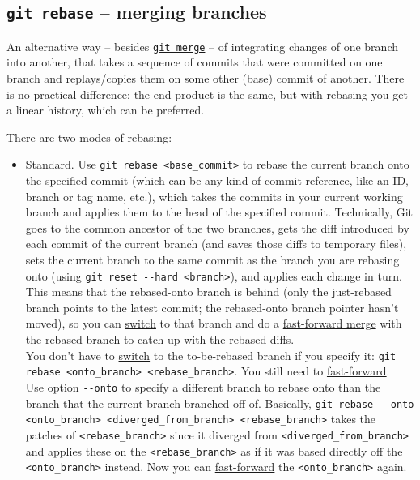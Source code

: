 \documentclass[8pt, table, xcdraw]{article}%
\begin{document}
\subsection{\lstinline{git rebase} -- merging branches} \label{rebase}

An alternative way -- besides \hyperref[merge]{\lstinline{git merge}} -- of integrating changes of one branch into another, that takes a sequence of commits that were committed on one branch and replays/copies them on some other (base) commit of another. There is no practical difference; the end product is the same, but with rebasing you get a linear history, which can be preferred.

There are two modes of rebasing:

\begin{itemize}
    \item Standard. Use \lstinline{git rebase <base_commit>} to rebase the current branch onto the specified commit (which can be any kind of commit reference, like an ID, branch or tag name, etc.), which takes the commits in your current working branch and applies them to the head of the specified commit. Technically, Git goes to the common ancestor of the two branches, gets the diff introduced by each commit of the current branch (and saves those diffs to temporary files), sets the current branch to the same commit as the branch you are rebasing onto (using \lstinline{git reset --hard <branch>}), and applies each change in turn. This means that the rebased-onto branch is behind (only the just-rebased branch points to the latest commit; the rebased-onto branch pointer hasn't moved), so you can \hyperref[checkout]{switch} to that branch and do a \hyperref[merge]{fast-forward merge} with the rebased branch to catch-up with the rebased diffs.\\
    You don't have to \hyperref[checkout]{switch} to the to-be-rebased branch if you specify it: \lstinline{git rebase <onto_branch> <rebase_branch>}. You still need to \hyperref[merge]{fast-forward}.\\
    Use option \lstinline{--onto} to specify a different branch to rebase onto than the branch that the current branch branched off of. Basically, \lstinline{git rebase --onto <onto_branch> <diverged_from_branch> <rebase_branch>} takes the patches of \lstinline{<rebase_branch>} since it diverged from \lstinline{<diverged_from_branch>} and applies these on the \lstinline{<rebase_branch>} as if it was based directly off the \lstinline{<onto_branch>} instead. Now you can \hyperref[merge]{fast-forward} the \lstinline{<onto_branch>} again.

\end{itemize}
\end{document}
